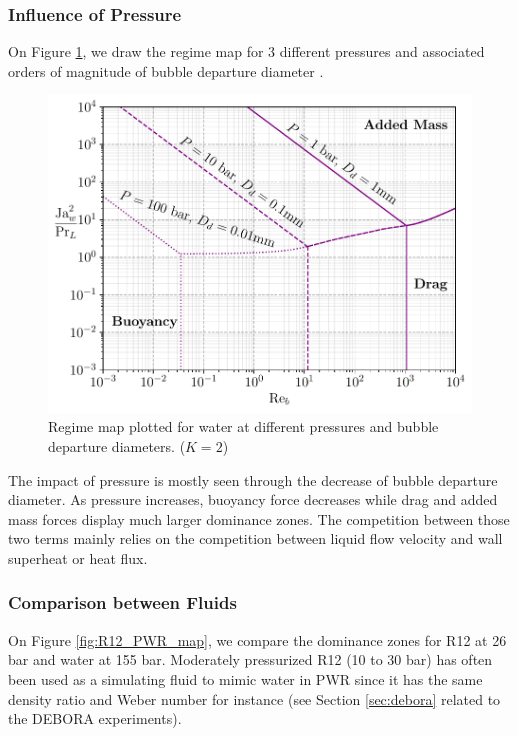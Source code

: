 \subsubsection{Influence of Pressure}

On Figure \ref{fig:press_map}, we draw the regime map for 3 different pressures and associated orders of magnitude of bubble departure diameter \cite{kocamustafaogullari_pressure_1983}.


\begin{figure}[h!]
\centering
\includegraphics[width=0.6\linewidth]{img/bub_dyn/dep_maps/press_map.pdf}
\caption{Regime map plotted for water at different pressures and bubble departure diameters. ($K=2$)}
\label{fig:press_map}
\end{figure}


The impact of pressure is mostly seen through the decrease of bubble departure diameter. As pressure increases, buoyancy force decreases while drag and added mass forces display much larger dominance zones. The competition between those two terms mainly relies on the competition between liquid flow velocity and wall superheat or heat flux.

 
\subsubsection{Comparison between Fluids}

 
On Figure \ref{fig:R12_PWR_map}, we compare the dominance zones for R12 at 26 bar and water at 155 bar. Moderately pressurized R12 (10 to 30 bar) has often been used as a simulating fluid to mimic water in PWR since it has the same density ratio and Weber number for instance (see Section \ref{sec:debora} related to the DEBORA experiments).

